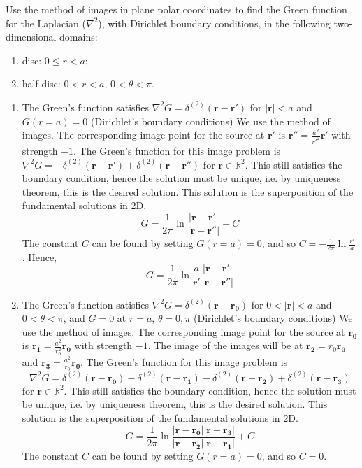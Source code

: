 \documentclass[a4paper]{article}
\begin{document}
\newpage
\begin{qns}[Images]
Use the method of images in plane polar coordinates to find the Green function for the Laplacian ($\nabla^2$), with Dirichlet boundary conditions, in the following two-dimensional domains:
\begin{enumerate}[label=(\roman*)]
    \item disc: $0\leq r<a$;
    \item half-disc: $0<r<a$, $0<\theta<\pi$.
\end{enumerate}
\end{qns}
\begin{ans}\leavevmode
\begin{enumerate}[label=(\roman*)]
\item The Green's function satisfies $\nabla^2G=\delta^{(2)}(\mathbf{r}-\mathbf{r'})$ for $|\mathbf{r}|<a$ and $G(r=a)=0$ (Dirichlet's boundary conditions) We use the method of images. The corresponding image point for the source at $\mathbf{r'}$ is $\mathbf{r''}=\frac{a^2}{r'^2}\mathbf{r'}$ with strength $-1$. The Green's function for this image problem is $\nabla^2G=-\delta^{(2)}(\mathbf{r}-\mathbf{r'})+\delta^{(2)}(\mathbf{r}-\mathbf{r''})$ for $\mathbf{r}\in\mathbb{R}^2$. This still satisfies the boundary condition, hence the solution must be unique, i.e. by uniqueness theorem, this is the desired solution. This solution is the superposition of the fundamental solutions in 2D.
$$G=\frac{1}{2\pi}\ln\frac{|\mathbf{r}-\mathbf{r'}|}{|\mathbf{r}-\mathbf{r''}|}+C$$
The constant $C$ can be found by setting $G(r=a)=0$, and so $C=-\frac{1}{2\pi}\ln\frac{r'}{a}$. Hence, 
$$G=\frac{1}{2\pi}\ln\frac{a}{r'}\frac{|\mathbf{r}-\mathbf{r'}|}{|\mathbf{r}-\mathbf{r''}|}$$
\item The Green's function satisfies $\nabla^2G=\delta^{(2)}(\mathbf{r}-\mathbf{r_0})$ for $0<|\mathbf{r}|<a$ and $0<\theta<\pi$, and $G=0$ at $r=a$, $\theta=0,\pi$ (Dirichlet's boundary conditions) We use the method of images. The corresponding image point for the source at $\mathbf{r_0}$ is $\mathbf{r_1}=\frac{a^2}{r_0^2}\mathbf{r_0}$ with strength $-1$. The image of the images will be at $\mathbf{r_2}=r_0\mathbf{r_0}$ and $\mathbf{r_3}=\frac{a^2}{r_0}\mathbf{r_0}$. The Green's function for this image problem is $$\nabla^2G=\delta^{(2)}(\mathbf{r}-\mathbf{r_0})-\delta^{(2)}(\mathbf{r}-\mathbf{r_1})-\delta^{(2)}(\mathbf{r}-\mathbf{r_2})+\delta^{(2)}(\mathbf{r}-\mathbf{r_3})$$
for $\mathbf{r}\in\mathbb{R}^2$. This still satisfies the boundary condition, hence the solution must be unique, i.e. by uniqueness theorem, this is the desired solution. This solution is the superposition of the fundamental solutions in 2D.
$$G=\frac{1}{2\pi}\ln\frac{|\mathbf{r}-\mathbf{r_0}||\mathbf{r}-\mathbf{r_3}|}{|\mathbf{r}-\mathbf{r_2}||\mathbf{r}-\mathbf{r_1}|}+C$$
The constant $C$ can be found by setting $G(r=a)=0$, and so $C=0$.
\end{enumerate}
\end{ans}
\end{document}
